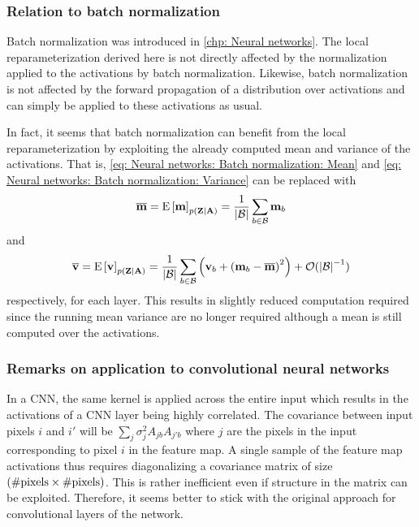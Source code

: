\subsubsection{Relation to batch normalization}
Batch normalization was introduced in \autoref{chp: Neural networks}. The local reparameterization derived here is not directly affected by the normalization applied to the activations by batch normalization. Likewise, batch normalization is not affected by the forward propagation of a distribution over activations and can simply be applied to these activations as usual.

In fact, it seems that batch normalization can benefit from the local reparameterization by exploiting the already computed mean and variance of the activations. That is, \eqref{eq: Neural networks: Batch normalization: Mean} and \eqref{eq: Neural networks: Batch normalization: Variance} can be replaced with
\begin{equation}
    \overline{{\mathbf{m}}}  = \text{E}\left[{\mathbf{m}}\right]_{p({\mathbf{Z}}|{\mathbf{A}})} = \frac{1}{{\left\lvert\mathcal{B}\right\rvert}} \sum_{b\in\mathcal{B}} {\mathbf{m}}_{b}
\end{equation}
and
\begin{equation}
    \overline{{\mathbf{v}}}  = \text{E}\left[{\mathbf{v}}\right]_{p({\mathbf{Z}}|{\mathbf{A}})} = \frac{1}{{\left\lvert\mathcal{B}\right\rvert}} \sum_{b\in\mathcal{B}} \left( {\mathbf{v}}_b + {\left({\mathbf{m}}_b - \overline{{\mathbf{m}}}\right)}^2 \right) +\mathcal{O}({\left\lvert\mathcal{B}\right\rvert}^{-1})
\end{equation}
respectively, for each layer. This results in slightly reduced computation required since the running mean variance are no longer required although a mean is still computed over the activations. 


\subsubsection{Remarks on application to convolutional neural networks}
In a \gls{CNN}, the same kernel is applied across the entire input which results in the activations of a \gls{CNN} layer being highly correlated. The covariance between input pixels $i$ and $i'$ will be $\sum_j \sigma^2_j A_{jb} A_{j'b}$ where $j$ are the pixels in the input corresponding to pixel $i$ in the feature map.
A single sample of the feature map activations thus requires diagonalizing a covariance matrix of size ${\left(\#\text{pixels}\times\#\text{pixels}\right)}$. 
This is rather inefficient even if structure in the matrix can be exploited.
Therefore, it seems better to stick with the original approach for convolutional layers of the network.




